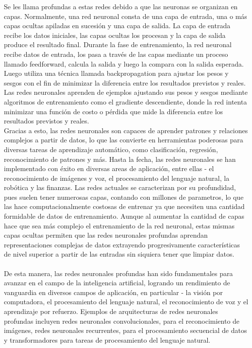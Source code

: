 \documentclass[12pt,letterpaper,final, openany]{scrbook}
\begin{document}
Se les llama profundas a estas redes debido a que las neuronas se organizan en capas. Normalmente, una red neuronal consta de una capa de entrada, una o más capas ocultas apiladas en sucesión y una capa de salida. La capa de entrada recibe los datos iniciales, las capas ocultas los procesan y la capa de salida produce el resultado final. Durante la fase de entrenamiento, la red neuronal recibe datos de entrada, los pasa a través de las capas mediante un proceso llamado feedforward, calcula la salida y luego la compara con la salida esperada. Luego utiliza una técnica llamada backpropagation para ajustar los pesos y sesgos con el fin de minimizar la diferencia entre los resultados previstos y reales. Las redes neuronales aprenden de ejemplos ajustando sus pesos y sesgos mediante algoritmos de entrenamiento como el gradiente descendiente, donde la red intenta minimizar una función de costo o pérdida que mide la diferencia entre los resultados previstos y reales.
\\
Gracias a esto, las redes neuronales son capaces de aprender patrones y relaciones complejos a partir de datos, lo que las convierte en herramientas poderosas para diversas tareas de aprendizaje automático, como clasificación, regresión, reconocimiento de patrones y más. Hasta la fecha, las redes neuronales se han implementado con éxito en diversas areas de aplicación, entre ellas - el reconocimiento de imágenes y voz, el procesamiento del lenguaje natural, la robótica y las finanzas. Las redes actuales se caracterizan por su profundidad, pues suelen tener numerosas capas, contando con millones de parametros, lo que las hace computacionalmente costosas de entrenar ya que necesiten una cantidad formidable de datos de entrenamiento. Aunque al aumentar la cantidad de capas hace que sea más complejo el entrenamiento de la red neuronal, estas mismas capas ocultas permiten que las redes neuronales profundas aprendan representaciones complejas de datos extrayendo progresivamente características de nivel superior a partir de las entradas sin siquiera tener que limpiar datos. 
\\
\\
De esta manera, las redes neuronales profundas han sido fundamentales para avanzar en el campo de la inteligencia artificial, logrando un rendimiento de vanguardia en diversos campos de aplicación, en particular - la visión por computadora, el procesamiento del lenguaje natural, el reconocimiento de voz y el aprendizaje por refuerzo. Ejemplos de arquitecturas de redes neuronales profundas incluyen redes neuronales convolucionales, para el reconocimiento de imágenes, redes neuronales recurrentes, para el procesamiento secuencial de datos y transformadores para tareas de procesamiento del lenguaje natural.
\end{document}
